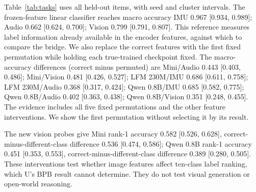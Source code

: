 Table~\ref{tab:tasks} uses all held-out items, with seed and cluster intervals. The frozen-feature linear classifier reaches macro accuracy IMU 0.967 [0.934, 0.989]; Audio 0.662 [0.624, 0.700]; Vision 0.799 [0.791, 0.807]. This reference measures label information already available in the encoder features, against which to compare the bridge. We also replace the correct features with the first fixed permutation while holding each true-trained checkpoint fixed. The macro-accuracy differences (correct minus permuted) are Mini/Audio 0.443 [0.403, 0.486]; Mini/Vision 0.481 [0.426, 0.527]; LFM 230M/IMU 0.686 [0.611, 0.758]; LFM 230M/Audio 0.368 [0.317, 0.424]; Qwen 0.8B/IMU 0.685 [0.582, 0.775]; Qwen 0.8B/Audio 0.402 [0.363, 0.438]; Qwen 0.8B/Vision 0.351 [0.248, 0.455]. The evidence includes all five fixed permutations and the other feature interventions. We show the first permutation without selecting it by its result.

The new vision probes give Mini rank-1 accuracy 0.582 [0.526, 0.628], correct-minus-different-class difference 0.536 [0.474, 0.586]; Qwen 0.8B rank-1 accuracy 0.451 [0.353, 0.553], correct-minus-different-class difference 0.389 [0.280, 0.505]. These interventions test whether image features affect ten-class label ranking, which U's BPB result cannot determine. They do not test visual generation or open-world reasoning.
